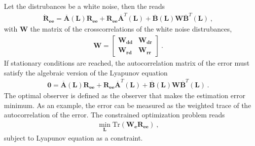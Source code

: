 \documentclass[letterpaper,10pt,english]{jupyterBook}
\begin{document}
\sphinxAtStartPar
Let the distrubances be a white noise, then the {\hyperref[\detokenize{ch/ode/ode-linear-systems:ode-linear-miscellanea-stochastic-response-correlation-matrix-lyapunov}]{}} reads
\begin{equation*}
\begin{split}\dot{\mathbf{R}}_{\mathbf{e}\mathbf{e}} = \overline{\mathbf{A}}(\mathbf{L}) \mathbf{R}_{\mathbf{e}\mathbf{e}} + \mathbf{R}_{\mathbf{e}\mathbf{e}} \overline{\mathbf{A}}^T(\mathbf{L}) + \overline{\mathbf{B}}(\mathbf{L}) \mathbf{W} \overline{\mathbf{B}}^T (\mathbf{L})\ ,\end{split}
\end{equation*}
\sphinxAtStartPar
with \(\mathbf{W}\) the matrix of the cross\sphinxhyphen{}correlations of the white noise distrubances,
\begin{equation*}
\begin{split}\mathbf{W} = \begin{bmatrix}
\mathbf{W}_{\mathbf{d}\mathbf{d}} & \mathbf{W}_{\mathbf{d}\mathbf{r}} \\
\mathbf{W}_{\mathbf{r}\mathbf{d}} & \mathbf{W}_{\mathbf{r}\mathbf{r}}
\end{bmatrix} \ .
\end{split}
\end{equation*}
\sphinxAtStartPar
If stationary conditions are reached, the autocorrelation matrix of the error must satisfy the algebraic version of the Lyapunov equation
\begin{equation}\label{equation:ch/control/optimal-control-observer-stochastic:eq:observer:error:lyapunov:algebraic}
\begin{split}\mathbf{0} = \overline{\mathbf{A}} (\mathbf{L})\mathbf{R}_{\mathbf{e}\mathbf{e}} + \mathbf{R}_{\mathbf{e}\mathbf{e}} \overline{\mathbf{A}}^T (\mathbf{L})+ \overline{\mathbf{B}}(\mathbf{L}) \mathbf{W} \overline{\mathbf{B}}^T(\mathbf{L}) \ .\end{split}
\end{equation}
\sphinxAtStartPar
{} The optimal observer is defined as the observer that makes the estimation error minimum. As an example, the error can be measured as the weighted trace of the auto\sphinxhyphen{}correlation of the error. The constrained optimization problem reads
\begin{equation*}
\begin{split}\min_{\mathbf{L}} \text{Tr}\left( \mathbf{W}_{\mathbf{e}} \mathbf{R}_{\mathbf{e}\mathbf{e}} \right) \ ,\end{split}
\end{equation*}
\sphinxAtStartPar
subject to Lyapunov equation as a constraint.
\end{document}
